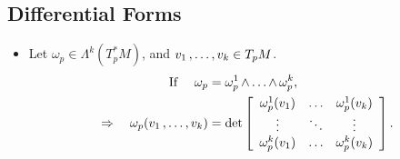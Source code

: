 \documentclass[11pt]{article}
\begin{document}
\subsection{Differential Forms}
\begin{itemize}
\item Let $\omega_p \in \Lambda^k(T_{p}^{*}M)$, and $v_1 \,{,}\ldots{,}\, v_k \in T_pM$.
\begin{align}
\text{If } \quad \omega_p &= \omega_p^{1} \,{\wedge}\ldots{\wedge}\, \omega_p^{k}, \nonumber\\
\Rightarrow \quad \omega_p(v_1 \,{,}\ldots{,}\, v_k)&=\det\left[\begin{array}{ccc}
\omega_p^{1}(v_1) & \ldots & \omega_p^{1}(v_k)  \\
\vdots & \ddots & \vdots \\
\omega_p^{k}(v_1) & \ldots & \omega_p^{k}(v_k) 
\end{array}\right]. \label{eqn: differential_k_form_act_on_tangent_vector_determinant_1}
\end{align}


\end{itemize}
\end{document}
